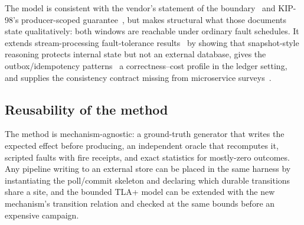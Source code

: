 The model is consistent with the vendor's statement of the boundary~\cite{kafka-design} and
KIP-98's producer-scoped guarantee~\cite{kip98}, but makes structural what those documents state
qualitatively: both windows are reachable under ordinary fault schedules. It extends
stream-processing fault-tolerance results~\cite{flink2017,millwheel2013} by showing that
snapshot-style reasoning protects internal state but not an external database, gives the
outbox/idempotency patterns~\cite{debezium-outbox,stripe-idempotency} a correctness--cost profile
in the ledger setting, and supplies the consistency contract missing from microservice
surveys~\cite{laigner2021,micro2026}.

\subsection{Reusability of the method}
\label{sec:dec-reuse}

The method is mechanism-agnostic: a ground-truth generator that writes the expected effect
before producing, an independent oracle that recomputes it, scripted faults with fire receipts,
and exact statistics for mostly-zero outcomes. Any pipeline writing to an external store can be
placed in the same harness by instantiating the poll/commit skeleton and declaring which durable
transitions share a site, and the bounded TLA+ model can be extended with the new mechanism's
transition relation and checked at the same bounds before an expensive campaign.

